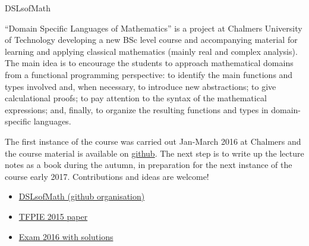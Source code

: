 \documentclass[DIV16,twocolumn,10pt]{scrreprt}
\begin{document}
\begin{hcarentry}{DSLsofMath}
\makeheader

``Domain Specific Languages of Mathematics'' is a project at Chalmers
University of Technology developing a new BSc level course and
accompanying material for learning and applying classical mathematics
(mainly real and complex analysis).
%
The main idea is to encourage the students to approach mathematical
domains from a functional programming perspective:
%
to identify the main functions and types involved and, when necessary,
to introduce new abstractions;
%
to give calculational proofs;
%
to pay attention to the syntax of the mathematical expressions;
%
and, finally, to organize the resulting functions and types in
domain-specific languages.

The first instance of the course was carried out Jan-March 2016 at
Chalmers and the course material is available on
\href{https://github.com/DSLsofMath/DSLsofMath}{github}.
%
The next step is to write up the lecture notes as a book during the
autumn, in preparation for the next instance of the course early 2017.
%
Contributions and ideas are welcome!

\FurtherReading
\begin{itemize}
\item \href{https://github.com/DSLsofMath}{DSLsofMath (github organisation)}
\item \href{https://github.com/DSLsofMath/tfpie2015}{TFPIE 2015 paper}
\item \href{https://github.com/DSLsofMath/DSLsofMath/blob/master/Exam/2016-03/}{Exam 2016 with solutions}
\end{itemize}
\end{hcarentry}
\end{document}
